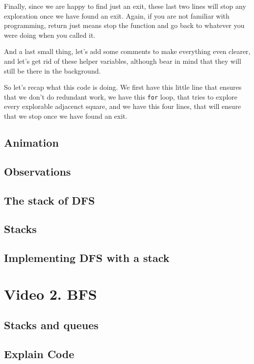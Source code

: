 \documentclass[12pt]{article}
\begin{document}
Finally, since we are happy to find just an exit, these last two
lines will stop any exploration once we have found
an exit. Again, if you are not familiar with programming,
return just means stop the function and go back to whatever
you were doing when you called it.

And a last small thing, let's add some comments to make
everything even clearer, and let's get rid of these
helper variables, although bear in mind that they will
still be there in the background.

So let's recap what this code is doing. We first have this
little line that ensures that we don't do redundant work,
we have this \verb|for| loop, that tries to explore
every explorable adjacenct square,
and we have this four lines, that will ensure that we stop
once we have found an exit.

\subsection{Animation}

\subsection{Observations}

\subsection{The stack of DFS}

\subsection{Stacks}

\subsection{Implementing DFS with a stack}

\section{Video 2. BFS}

\subsection{Stacks and queues}

\subsection{Explain Code}
\end{document}
